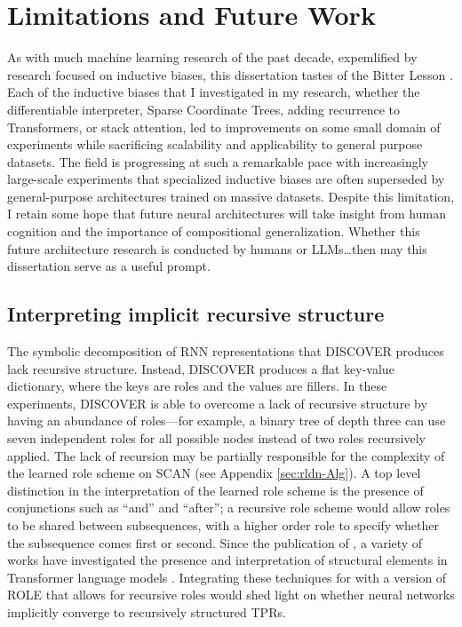 \section{Limitations and Future Work}

As with much machine learning research of the past decade, expemlified by research focused on inductive biases, this dissertation tastes of the Bitter Lesson \citep{Sutton2019BitterLesson}. Each of the inductive biases that I investigated in my research, whether the differentiable interpreter, Sparse Coordinate Trees, adding recurrence to Transformers, or stack attention, led to improvements on some small domain of experiments while sacrificing scalability and applicability to general purpose datasets. The field is progressing at such a remarkable pace with increasingly large-scale experiments that specialized inductive biases are often superseded by general-purpose architectures trained on massive datasets. Despite this limitation, I retain some hope that future neural architectures will take insight from human cognition and the importance of compositional generalization. Whether this future architecture research is conducted by humans or LLMs\ldots then may this dissertation serve as a useful prompt.

\subsection{Interpreting implicit recursive structure}
The symbolic decomposition of RNN representations that DISCOVER produces lack recursive structure. Instead, DISCOVER produces a flat key-value dictionary, where the keys are roles and the values are fillers. In these experiments, DISCOVER is able to overcome a lack of recursive structure by having an abundance of roles—for example, a binary tree of depth three can use seven independent roles for all possible nodes instead of two roles recursively applied. The lack of recursion may be partially responsible for the complexity of the learned role scheme on SCAN (see Appendix \ref{sec:rldn-Alg}). A top level distinction in the interpretation of the learned role scheme is the presence of conjunctions such as ``and'' and ``after''; a recursive role scheme would allow roles to be shared between subsequences, with a higher order role to specify whether the subsequence comes first or second. Since the publication of \citet{soulos-etal-2020-discovering}, a variety of works have investigated the presence and interpretation of structural elements in Transformer language models \citep{hewitt2019structural,murty2022characterizing,murty2023grokking}. Integrating these techniques for with a version of ROLE that allows for recursive roles would shed light on whether neural networks implicitly converge to recursively structured TPRs.


